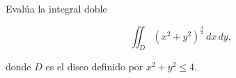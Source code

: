 Evalúa la integral doble

\[
\iint_D (x^2 + y^2)^{\frac{3}{2}} \, dx \, dy,
\]

donde \( D \) es el disco definido por \( x^2 + y^2 \leq 4 \).
